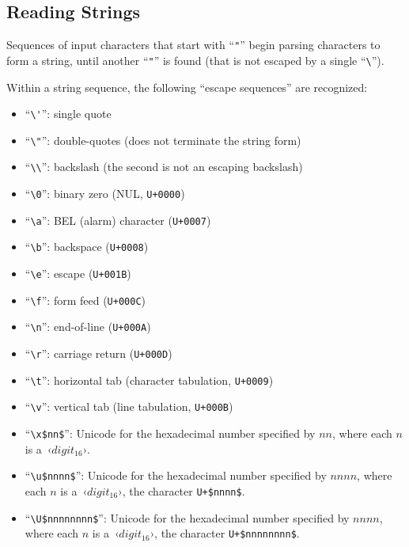 \subsection{Reading Strings}
\label{subsec:aml-base-lang-reader-strings}

Sequences of input characters that start with ``\lstinline!"!'' begin parsing characters to form a string, until another ``\lstinline!"!'' is found (that is not escaped by a single ``\lstinline!\!''). %

Within a string sequence, the following ``escape sequences'' are recognized:

\begin{itemize}
  \item ``\lstinline!\'!'': single quote
  \item ``\lstinline!\"!'': double-quotes (does not terminate the string form)
  \item ``\lstinline!\\!'': backslash (the second is not an escaping backslash)
  \item ``\lstinline!\0!'': binary zero (NUL, \lstinline!U+0000!)
  \item ``\lstinline!\a!'': BEL (alarm) character (\lstinline!U+0007!)
  \item ``\lstinline!\b!'': backspace (\lstinline!U+0008!)
  \item ``\lstinline!\e!'': escape (\lstinline!U+001B!)
  \item ``\lstinline!\f!'': form feed (\lstinline!U+000C!)
  \item ``\lstinline!\n!'': end-of-line (\lstinline!U+000A!)
  \item ``\lstinline!\r!'': carriage return (\lstinline!U+000D!)
  \item ``\lstinline!\t!'': horizontal tab (character tabulation, \lstinline!U+0009!)
  \item ``\lstinline!\v!'': vertical tab (line tabulation, \lstinline!U+000B!)
  
  \item ``\lstinline!\x$nn$!'': Unicode for the hexadecimal number specified by $nn$, where each $n$ is a~‹$digit_{16}$›.
  \item ``\lstinline!\u$nnnn$!'': Unicode for the hexadecimal number specified by $nnnn$, where each $n$ is a~‹$digit_{16}$›, the character \lstinline!U+$nnnn$!.
  \item ``\lstinline!\U$nnnnnnnn$!'': Unicode for the hexadecimal number specified by $nnnn$, where each $n$ is a~‹$digit_{16}$›, the character \lstinline!U+$nnnnnnnn$!.
  

\end{itemize}
